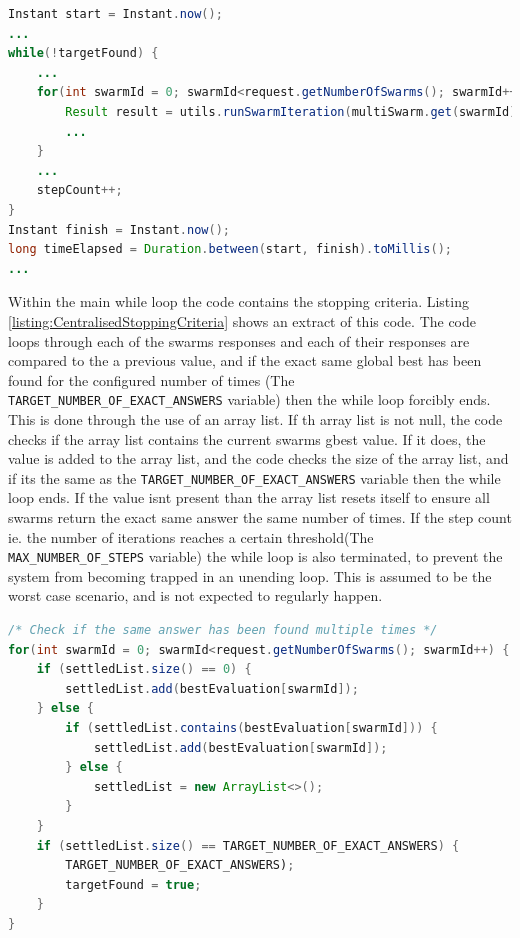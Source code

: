 \documentclass[oneside,12pt]{book}
\begin{document}
\begin{lstlisting}[basicstyle=\footnotesize, language=Java]
Instant start = Instant.now();
...
while(!targetFound) {
    ...
    for(int swarmId = 0; swarmId<request.getNumberOfSwarms(); swarmId++) {
        Result result = utils.runSwarmIteration(multiSwarm.get(swarmId), stepCount);
        ...
    }
    ...
    stepCount++;
}
Instant finish = Instant.now();
long timeElapsed = Duration.between(start, finish).toMillis();
...
\end{lstlisting}
\label{listing:CentralisedIterationMethod}

Within the main while loop the code contains the stopping criteria. Listing \ref{listing:CentralisedStoppingCriteria} shows an extract of this code. The code loops through each of the swarms responses and each of their responses are compared to the a previous value, and if the exact same global best has been found for the configured number of times (The \verb|TARGET_NUMBER_OF_EXACT_ANSWERS| variable) then the while loop forcibly ends. This is done through the use of an array list. If th array list is not null, the code checks if the array list contains the current swarms gbest value. If it does, the value is added to the array list, and the code checks the size of the array list, and if its the same as the \verb|TARGET_NUMBER_OF_EXACT_ANSWERS| variable then the while loop ends. If the value isnt present than the array list resets itself to ensure all swarms return the exact same answer the same number of times. If the step count ie. the number of iterations reaches a certain threshold(The \verb|MAX_NUMBER_OF_STEPS| variable) the while loop is also terminated, to prevent the system from becoming trapped in an unending loop. This is assumed to be the worst case scenario, and is not expected to regularly happen. 

\begin{lstlisting}[basicstyle=\footnotesize, language=Java]
/* Check if the same answer has been found multiple times */
for(int swarmId = 0; swarmId<request.getNumberOfSwarms(); swarmId++) {
    if (settledList.size() == 0) {
        settledList.add(bestEvaluation[swarmId]);
    } else {
        if (settledList.contains(bestEvaluation[swarmId])) {
            settledList.add(bestEvaluation[swarmId]);
        } else {
            settledList = new ArrayList<>();
        }
    }
    if (settledList.size() == TARGET_NUMBER_OF_EXACT_ANSWERS) {
        TARGET_NUMBER_OF_EXACT_ANSWERS);
        targetFound = true;
    }
}
\end{lstlisting}
\label{listing:CentralisedStoppingCriteria}
\end{document}
